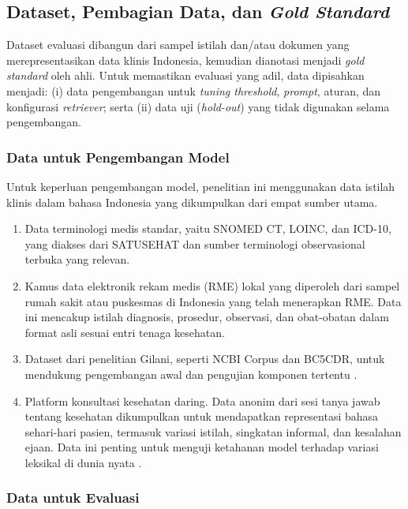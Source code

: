 \subsection{Dataset, Pembagian Data, dan \textit{Gold Standard}}

Dataset evaluasi dibangun dari sampel istilah dan/atau dokumen yang merepresentasikan data klinis Indonesia, kemudian dianotasi menjadi \textit{gold standard} oleh ahli. Untuk memastikan evaluasi yang adil, data dipisahkan menjadi: (i) data pengembangan untuk \textit{tuning threshold}, \textit{prompt}, aturan, dan konfigurasi \textit{retriever}; serta (ii) data uji (\textit{hold-out}) yang tidak digunakan selama pengembangan.

\subsubsection{Data untuk Pengembangan Model}

Untuk keperluan pengembangan model, penelitian ini menggunakan data istilah klinis dalam bahasa Indonesia yang dikumpulkan dari empat sumber utama.

\begin{enumerate}
    \item Data terminologi medis standar, yaitu SNOMED CT, LOINC, dan ICD-10, yang diakses dari SATUSEHAT dan sumber terminologi observasional terbuka yang relevan.
    \item Kamus data elektronik rekam medis (RME) lokal yang diperoleh dari sampel rumah sakit atau puskesmas di Indonesia yang telah menerapkan RME. Data ini mencakup istilah diagnosis, prosedur, observasi, dan obat-obatan dalam format asli sesuai entri tenaga kesehatan.
    \item Dataset dari penelitian Gilani, seperti NCBI Corpus dan BC5CDR, untuk mendukung pengembangan awal dan pengujian komponen tertentu \citep{gilani_cde-mapper_2025}.
    \item Platform konsultasi kesehatan daring. Data anonim dari sesi tanya jawab tentang kesehatan dikumpulkan untuk mendapatkan representasi bahasa sehari-hari pasien, termasuk variasi istilah, singkatan informal, dan kesalahan ejaan. Data ini penting untuk menguji ketahanan model terhadap variasi leksikal di dunia nyata \citep{purwitasari_comparison_2023}.
\end{enumerate}

\subsubsection{Data untuk Evaluasi}

